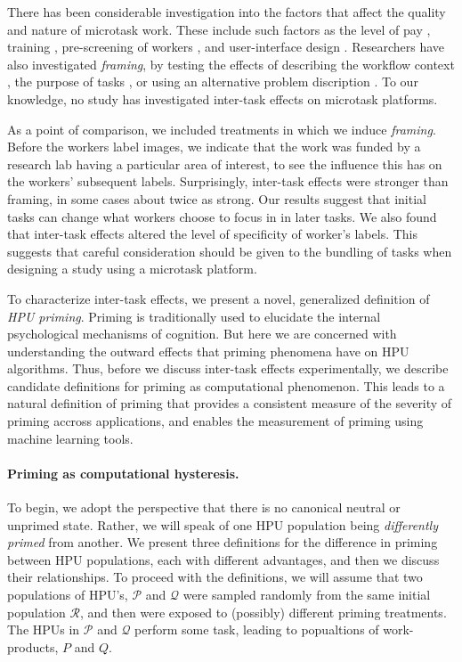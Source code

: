 \documentclass[12pt]{article}
\begin{document}
There has been considerable investigation into the factors that affect the 
quality and nature of microtask work.  These include such factors as the 
level of 
pay \cite{kazai2013analysis}, training \cite{le2010ensuring}, pre-screening of 
workers \cite{paolacci2010running}, and user-interface design 
\cite{Finnerty2013}.  Researchers have also investigated \textit{framing}, 
by testing the effects of describing the workflow context 
\cite{Kinnaird2012281}, the purpose of tasks 
\cite{chandler2013breaking}, or using an alternative problem discription
\cite{thibodeau2013natural}.  To our knowledge, no study has investigated 
inter-task effects on microtask platforms.

As a point of comparison, we included treatments in which we induce 
\textit{framing}.
Before the workers label images, we indicate that the work 
was funded by a research lab having a particular area of interest, to see the 
influence this has on the workers’ subsequent labels. 
Surprisingly, inter-task effects were stronger than framing, in some cases 
about twice as strong. 
Our results suggest that initial tasks can change what workers choose to focus
in in later tasks.  We also found that inter-task 
effects altered the level of specificity of worker's labels.  This suggests 
that careful consideration should be given to the bundling of 
tasks when designing a study using a microtask platform.

To characterize inter-task effects, we present a novel, generalized definition 
of \textit{HPU priming}. Priming is traditionally used to elucidate the
internal psychological mechanisms of cognition.  But here we are concerned with
understanding the outward effects that priming phenomena have on HPU 
algorithms. Thus, before we discuss inter-task effects experimentally, we 
describe candidate definitions for priming as computational phenomenon.  This 
leads to a natural definition of priming that provides a consistent measure of 
the severity of priming accross applications, and enables the measurement of 
priming using machine learning tools.

\paragraph*{Priming as computational hysteresis.}
To begin, we adopt the perspective that there is no canonical neutral or
unprimed state.  Rather, we will speak of one HPU population being 
\textit{differently primed} from another.  We present three definitions for 
the difference in priming between HPU populations, each with different 
advantages, and then we discuss their relationships. To proceed with the 
definitions, we will assume that two populations of HPU’s, $\mathcal{P}$ and 
$\mathcal{Q}$ were 
sampled randomly from the same initial population $\mathcal{R}$, and then were 
exposed to (possibly) different priming treatments. The HPUs in $\mathcal{P}$ 
and $\mathcal{Q}$ perform some task, leading to popualtions of work-products, 
$P$ and $Q$.
\end{document}
